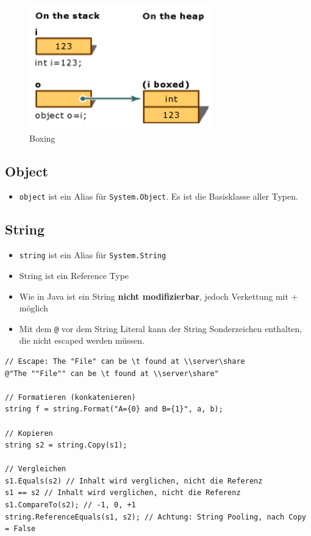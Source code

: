 \documentclass[
a4paper,
oneside,
10pt,
fleqn,
headsepline,
toc=listofnumbered, 
bibliography=totocnumbered]{scrartcl}
\begin{document}
\begin{figure}[!ht]
	\centering
	\includegraphics[width=0.4\linewidth]{images/boxing}
	\caption{Boxing}
	\label{fig:boxing}
\end{figure}



\subsection{Object}
\begin{itemize}
	\item \lstinline|object| ist ein Alias für \lstinline|System.Object|. Es ist die Basisklasse aller Typen.
\end{itemize}

\subsection{String}
\begin{itemize}
	\item \lstinline|string| ist ein Alias für \lstinline|System.String|
	\item String ist ein Reference Type
	\item Wie in Java ist ein String \textbf{nicht modifizierbar}, jedoch Verkettung mit + möglich
	\item Mit dem \lstinline|@| vor dem String Literal kann der String Sonderzeichen enthalten, die nicht escaped werden müssen.
\end{itemize}
\begin{lstlisting}
// Escape: The "File" can be \t found at \\server\share
@"The ""File"" can be \t found at \\server\share"

// Formatieren (konkatenieren)
string f = string.Format("A={0} and B={1}", a, b);

// Kopieren
string s2 = string.Copy(s1);

// Vergleichen
s1.Equals(s2) // Inhalt wird verglichen, nicht die Referenz
s1 == s2 // Inhalt wird verglichen, nicht die Referenz
s1.CompareTo(s2); // -1, 0, +1 
string.ReferenceEquals(s1, s2); // Achtung: String Pooling, nach Copy = False
\end{lstlisting}
\end{document}
